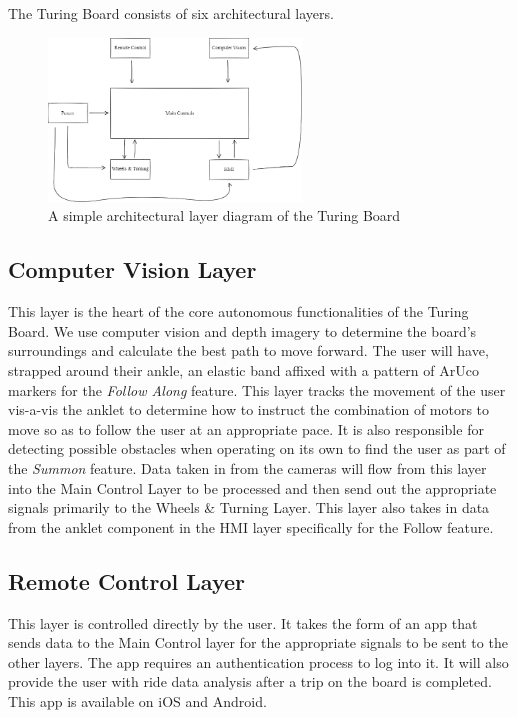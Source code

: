 The Turing Board consists of six architectural layers.

\begin{figure}[h!]
	\centering
 	\includegraphics[width=0.60\textwidth]{images/Introdcution_Layers.png}
 \caption{A simple architectural layer diagram of the Turing Board}
\end{figure}

\subsection{Computer Vision Layer}
This layer is the heart of the core autonomous functionalities of the Turing Board. We use computer vision and depth imagery to determine the board's surroundings and calculate the best path to move forward. The user will have, strapped around their ankle, an elastic band affixed with a pattern of ArUco markers for the \textit{Follow Along} feature. This layer tracks the movement of the user vis-a-vis the anklet to determine how to instruct the combination of motors to move so as to follow the user at an appropriate pace. It is also responsible for detecting possible obstacles when operating on its own to find the user as part of the \textit{Summon} feature. 
Data taken in from the cameras will flow from this layer into the Main Control Layer to be processed and then send out the appropriate signals primarily to the Wheels \& Turning Layer. This layer also takes in data from the anklet component in the HMI layer specifically for the Follow feature.

\subsection{Remote Control Layer}
This layer is controlled directly by the user. It takes the form of an app that sends data to the Main Control layer for the appropriate signals to be sent to the other layers. The app requires an authentication process to log into it. It will also provide the user with ride data analysis after a trip on the board is completed. This app is available on iOS and Android.

